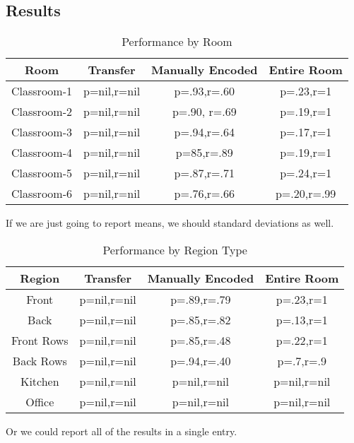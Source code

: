 \subsection{Results}
\begin{table}
\small
\caption{Performance by Room}
\begin{tabular}{|c|c|c|c|}
\hline
Room & Transfer & Manually Encoded & Entire Room \\
\hline
Classroom-1 & p=nil,r=nil & p=.93,r=.60 & p=.23,r=1 \\
Classroom-2 & p=nil,r=nil & p=.90, r=.69 & p=.19,r=1 \\
Classroom-3 & p=nil,r=nil & p=.94,r=.64 & p=.17,r=1 \\
Classroom-4 & p=nil,r=nil & p=85,r=.89 & p=.19,r=1 \\  %
Classroom-5 & p=nil,r=nil & p=.87,r=.71 & p=.24,r=1 \\ %
Classroom-6 & p=nil,r=nil & p=.76,r=.66 & p=.20,r=.99 \\ %
\hline
\end{tabular}
\end{table}


If we are just going to report means, we should standard deviations as well. %

\begin{table}
\small
\caption{Performance by Region Type}
\begin{tabular}{|c|c|c|c|}
\hline
Region & Transfer & Manually Encoded & Entire Room \\
\hline
Front & p=nil,r=nil & p=.89,r=.79 & p=.23,r=1 \\
Back & p=nil,r=nil & p=.85,r=.82 & p=.13,r=1 \\
Front Rows & p=nil,r=nil & p=.85,r=.48 & p=.22,r=1 \\
Back Rows & p=nil,r=nil & p=.94,r=.40 & p=.7,r=.9 \\
Kitchen & p=nil,r=nil & p=nil,r=nil & p=nil,r=nil \\
Office & p=nil,r=nil & p=nil,r=nil & p=nil,r=nil \\
\hline
\end{tabular}
\end{table}

Or we could report all of the results in a single entry.


